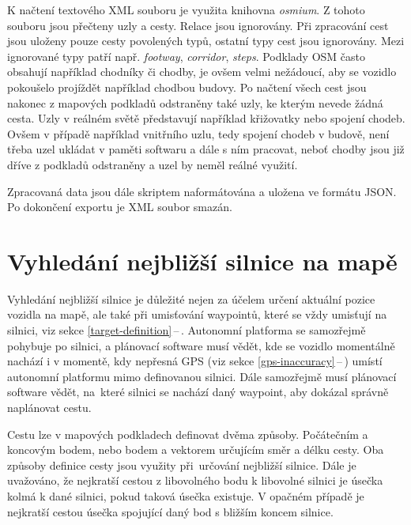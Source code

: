 \documentclass[czech, bachelor]{diploma}
\newcommand{\filipref}[1]{\ref{#1}\,--\,\nameref{#1}}
\begin{document}
K načtení textového XML souboru je využita knihovna \emph{osmium}. Z tohoto souboru jsou přečteny uzly a cesty. Relace jsou
ignorovány. Při zpracování cest jsou uloženy pouze cesty povolených typů, ostatní typy cest jsou ignorovány. Mezi ignorované typy
patří např. \emph{footway}, \emph{corridor}, \emph{steps}. Podklady OSM často obsahují například chodníky či chodby, je ovšem
velmi nežádoucí, aby se vozidlo pokoušelo projíždět například chodbou budovy. Po načtení všech cest jsou nakonec z mapových
podkladů odstraněny také uzly, ke kterým nevede žádná cesta. Uzly v reálném světě představují například křižovatky nebo spojení
chodeb. Ovšem v případě například vnitřního uzlu, tedy spojení chodeb v budově, není třeba uzel ukládat v paměti softwaru a dále
s ním pracovat, neboť chodby jsou již dříve z podkladů odstraněny a uzel by neměl reálné využití.

Zpracovaná data jsou dále skriptem naformátována a uložena ve formátu JSON. Po dokončení exportu je XML soubor smazán.

\section{Vyhledání nejbližší silnice na mapě}

Vyhledání nejbližší silnice je důležité nejen za účelem určení aktuální pozice vozidla na mapě, ale také při umisťování waypointů,
které se vždy umisťují na silnici, viz sekce \filipref{target-definition}. Autonomní platforma se samozřejmě pohybuje po silnici,
a plánovací software musí vědět, kde se vozidlo momentálně nachází i v momentě, kdy nepřesná GPS (viz sekce
\filipref{gps-inaccuracy}) umístí autonomní platformu mimo definovanou silnici. Dále samozřejmě musí plánovací software vědět,
na~které silnici se nachází daný waypoint, aby dokázal správně naplánovat cestu.

Cestu lze v mapových podkladech definovat dvěma způsoby. Počátečním a koncovým bodem, nebo bodem a vektorem určujícím směr a délku
cesty. Oba způsoby definice cesty jsou využity při~určování nejbližší silnice. Dále je uvažováno, že nejkratší cestou
z libovolného bodu k libovolné silnici je úsečka kolmá k dané silnici, pokud taková úsečka existuje. V opačném případě
je nejkratší cestou úsečka spojující daný bod s bližším koncem silnice.
\end{document}
